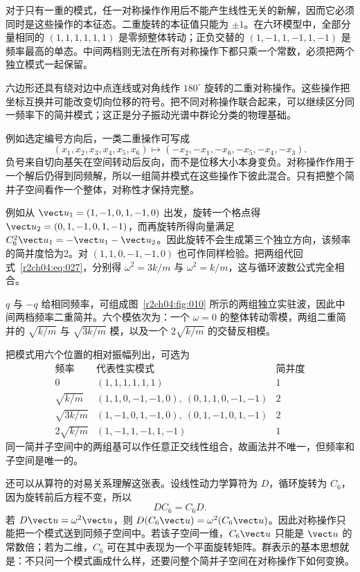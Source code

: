 对于只有一重的模式，任一对称操作作用后不能产生线性无关的新解，因而它必须同时是这些操作的本征态。二重旋转的本征值只能为 $\pm1$。在六环模型中，全部分量相同的
$(1,1,1,1,1,1)$ 是零频整体转动；正负交替的
$(1,-1,1,-1,1,-1)$ 是频率最高的单态。中间两档则无法在所有对称操作下都只乘一个常数，必须把两个独立模式一起保留。

六边形还具有绕对边中点连线或对角线作 $180^\circ$ 旋转的二重对称操作。这些操作把坐标互换并可能改变切向位移的符号。把不同对称操作联合起来，可以继续区分同一频率下的简并模式；这正是分子振动光谱中群论分类的物理基础。

例如选定编号方向后，一类二重操作可写成
\[
 (x_1,x_2,x_3,x_4,x_5,x_6)
 \mapsto(-x_2,-x_1,-x_6,-x_5,-x_4,-x_3).
\]
负号来自切向基矢在空间转动后反向，而不是位移大小本身变负。对称操作作用于一个解后仍得到同频解，所以一组简并模式在这些操作下彼此混合。只有把整个简并子空间看作一个整体，对称性才保持完整。

例如从
$\vect u_1=(1,-1,0,1,-1,0)$ 出发，旋转一个格点得
$\vect u_2=(0,1,-1,0,1,-1)$，而再旋转所得向量满足
$C_6^2\vect u_1=-\vect u_1-\vect u_2$。因此旋转不会生成第三个独立方向，该频率的简并度恰为2。对
$(1,1,0,-1,-1,0)$ 也可作同样检验。把两组代回式~\eqref{r2ch04:eq:027}，分别得 $\omega^2=3k/m$ 与 $\omega^2=k/m$，这与循环波数公式完全相合。

$q$ 与 $-q$ 给相同频率，可组成图~\ref{r2ch04:fig:010} 所示的两组独立实驻波，因此中间两档频率二重简并。六个模依次为：一个 $\omega=0$ 的整体转动零模，两组二重简并的 $\sqrt{k/m}$ 与 $\sqrt{3k/m}$ 模，以及一个 $2\sqrt{k/m}$ 的交替反相模。
\figDegenerateModes

把模式用六个位置的相对振幅列出，可选为
\[
\begin{array}{c|c|c}
\text{频率}&\text{代表性实模式}&\text{简并度}\\ \hline
0&(1,1,1,1,1,1)&1\\
\sqrt{k/m}&(1,1,0,-1,-1,0),\ (0,1,1,0,-1,-1)&2\\
\sqrt{3k/m}&(1,-1,0,1,-1,0),\ (0,1,-1,0,1,-1)&2\\
2\sqrt{k/m}&(1,-1,1,-1,1,-1)&1
\end{array}
\]
同一简并子空间中的两组基可以作任意正交线性组合，故画法并不唯一，但频率和子空间是唯一的。

还可以从算符的对易关系理解这张表。设线性动力学算符为 $D$，循环旋转为 $C_6$，因为旋转前后方程不变，所以
\[
 DC_6=C_6D.
\]
若 $D\vect u=\omega^2\vect u$，则
$D(C_6\vect u)=\omega^2(C_6\vect u)$。因此对称操作只能把一个模式送到同频子空间中。若该子空间一维，$C_6\vect u$ 只能是 $\vect u$ 的常数倍；若为二维，$C_6$ 可在其中表现为一个平面旋转矩阵。群表示的基本思想就是：不只问一个模式画成什么样，还要问整个简并子空间在对称操作下如何变换。

